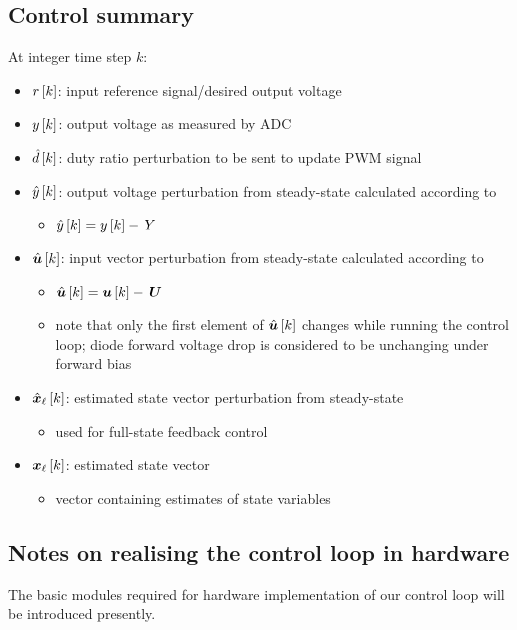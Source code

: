 \subsection{Control summary}
At integer time step $k$:
\begin{itemize}
\item $r\left[k\right]$: input reference signal/desired output voltage
\item $y\left[k\right]$: output voltage as measured by ADC
\item $\hat{d}\left[k\right]$: duty ratio perturbation to be sent to update PWM signal
\item $\hat{y}\left[k\right]$: output voltage perturbation from steady-state calculated according to
    \begin{itemize}
    \item $\hat{y}\left[k\right] = y\left[k\right] - \, Y$
    \end{itemize}
\item $\hat{\boldsymbol{u}}\left[k\right]$: input vector perturbation from steady-state calculated according to
    \begin{itemize}
    \item $\hat{\boldsymbol{u}}\left[k\right] = \boldsymbol{u}\left[k\right] - \, \boldsymbol{U}$
    \item note that only the first element of $\hat{\boldsymbol{u}}\left[k\right]$ changes while running the control loop; diode forward voltage drop is considered to be unchanging under forward bias
    \end{itemize}
\item $\hat{\boldsymbol{x}}_\ell\left[k\right]$: estimated state vector perturbation from steady-state
    \begin{itemize}
    \item used for full-state feedback control
    \end{itemize}
\item $\boldsymbol{x}_\ell\left[k\right]$: estimated state vector
    \begin{itemize}
    \item vector containing estimates of state variables
    \end{itemize}
\end{itemize}
\subsection{Notes on realising the control loop in hardware}\label{sec:hardware_for_control}
The basic modules required for hardware implementation of our control loop will be introduced presently.

